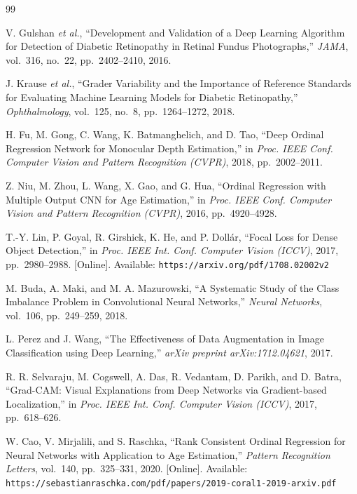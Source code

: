 \begin{thebibliography}{99}

V. Gulshan \textit{et al.},
``Development and Validation of a Deep Learning Algorithm for Detection of Diabetic Retinopathy in Retinal Fundus Photographs,''
\textit{JAMA}, vol.~316, no.~22, pp.~2402--2410, 2016.

J. Krause \textit{et al.},
``Grader Variability and the Importance of Reference Standards for Evaluating Machine Learning Models for Diabetic Retinopathy,''
\textit{Ophthalmology}, vol.~125, no.~8, pp.~1264--1272, 2018.

H. Fu, M. Gong, C. Wang, K. Batmanghelich, and D. Tao,
``Deep Ordinal Regression Network for Monocular Depth Estimation,''
in \textit{Proc. IEEE Conf. Computer Vision and Pattern Recognition (CVPR)}, 2018, pp.~2002--2011.

Z. Niu, M. Zhou, L. Wang, X. Gao, and G. Hua,
``Ordinal Regression with Multiple Output CNN for Age Estimation,''
in \textit{Proc. IEEE Conf. Computer Vision and Pattern Recognition (CVPR)}, 2016, pp.~4920--4928.

T.-Y. Lin, P. Goyal, R. Girshick, K. He, and P. Doll\'ar,
``Focal Loss for Dense Object Detection,''
in \textit{Proc. IEEE Int. Conf. Computer Vision (ICCV)}, 2017, pp.~2980--2988.
[Online]. Available: \texttt{https://arxiv.org/pdf/1708.02002v2}

M. Buda, A. Maki, and M. A. Mazurowski,
``A Systematic Study of the Class Imbalance Problem in Convolutional Neural Networks,''
\textit{Neural Networks}, vol.~106, pp.~249--259, 2018.

L. Perez and J. Wang,
``The Effectiveness of Data Augmentation in Image Classification using Deep Learning,''
\textit{arXiv preprint arXiv:1712.04621}, 2017.

R. R. Selvaraju, M. Cogswell, A. Das, R. Vedantam, D. Parikh, and D. Batra,
``Grad-CAM: Visual Explanations from Deep Networks via Gradient-based Localization,''
in \textit{Proc. IEEE Int. Conf. Computer Vision (ICCV)}, 2017, pp.~618--626.

W. Cao, V. Mirjalili, and S. Raschka,
``Rank Consistent Ordinal Regression for Neural Networks with Application to Age Estimation,''
\textit{Pattern Recognition Letters}, vol.~140, pp.~325--331, 2020.
[Online]. Available: \texttt{https://sebastianraschka.com/pdf/papers/2019-coral1-2019-arxiv.pdf}


\end{thebibliography}
